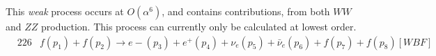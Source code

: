 This {\it weak} process occurs at $O(\alpha^6)$, and contains contributions, from  both $WW$ and $ZZ$ production.  
This process can currently only be calculated at lowest order.
\begin{eqnarray}
&226  &  f(p_1)+f(p_2) \to e-(p_3)+e^+(p_4)+\nu_e(p_5)+\bar{\nu}_e(p_6)+f(p_7)+f(p_8) [WBF]    \nonumber
\end{eqnarray}
